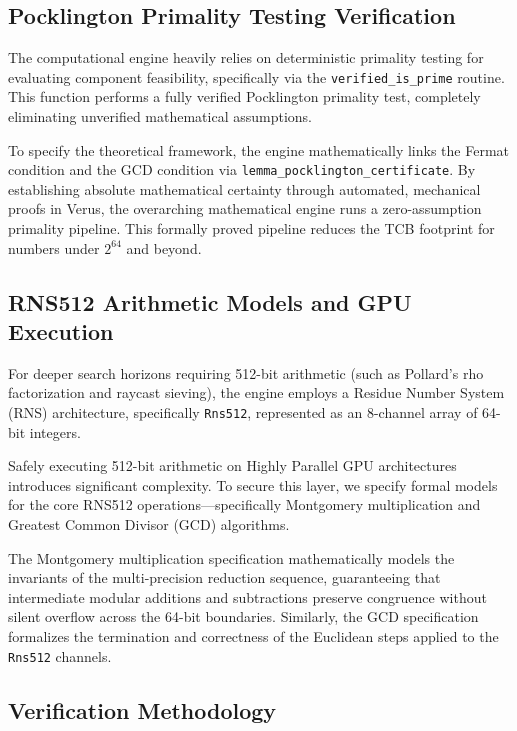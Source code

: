 \subsection{Pocklington Primality Testing Verification}
\label{app:subsec:miller_rabin}

The computational engine heavily relies on deterministic primality testing for evaluating component feasibility, specifically via the \texttt{verified\_is\_prime} routine. This function performs a fully verified Pocklington primality test, completely eliminating unverified mathematical assumptions.

To specify the theoretical framework, the engine mathematically links the Fermat condition and the GCD condition via \texttt{lemma\_pocklington\_certificate}. By establishing absolute mathematical certainty through automated, mechanical proofs in Verus, the overarching mathematical engine runs a zero-assumption primality pipeline. This formally proved pipeline reduces the TCB footprint for numbers under $2^{64}$ and beyond.

\subsection{RNS512 Arithmetic Models and GPU Execution}
\label{app:subsec:rns512}

For deeper search horizons requiring 512-bit arithmetic (such as Pollard's rho factorization and raycast sieving), the engine employs a Residue Number System (RNS) architecture, specifically \texttt{Rns512}, represented as an 8-channel array of 64-bit integers.

Safely executing 512-bit arithmetic on Highly Parallel GPU architectures introduces significant complexity. To secure this layer, we specify formal models for the core RNS512 operations---specifically Montgomery multiplication and Greatest Common Divisor (GCD) algorithms. 

The Montgomery multiplication specification mathematically models the invariants of the multi-precision reduction sequence, guaranteeing that intermediate modular additions and subtractions preserve congruence without silent overflow across the 64-bit boundaries. Similarly, the GCD specification formalizes the termination and correctness of the Euclidean steps applied to the \texttt{Rns512} channels.

\subsection{Verification Methodology}
\label{app:subsec:hybrid_verification}

